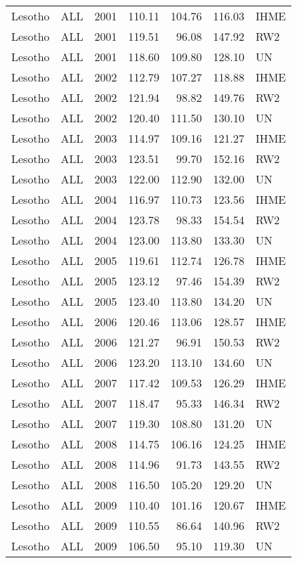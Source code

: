 \begin{longtable}{lllrrrl}
  Lesotho & ALL & 2001 & 110.11 & 104.76 & 116.03 & IHME \\ 
  Lesotho & ALL & 2001 & 119.51 & 96.08 & 147.92 & RW2 \\ 
  Lesotho & ALL & 2001 & 118.60 & 109.80 & 128.10 & UN \\ 
  Lesotho & ALL & 2002 & 112.79 & 107.27 & 118.88 & IHME \\ 
  Lesotho & ALL & 2002 & 121.94 & 98.82 & 149.76 & RW2 \\ 
  Lesotho & ALL & 2002 & 120.40 & 111.50 & 130.10 & UN \\ 
  Lesotho & ALL & 2003 & 114.97 & 109.16 & 121.27 & IHME \\ 
  Lesotho & ALL & 2003 & 123.51 & 99.70 & 152.16 & RW2 \\ 
  Lesotho & ALL & 2003 & 122.00 & 112.90 & 132.00 & UN \\ 
  Lesotho & ALL & 2004 & 116.97 & 110.73 & 123.56 & IHME \\ 
  Lesotho & ALL & 2004 & 123.78 & 98.33 & 154.54 & RW2 \\ 
  Lesotho & ALL & 2004 & 123.00 & 113.80 & 133.30 & UN \\ 
  Lesotho & ALL & 2005 & 119.61 & 112.74 & 126.78 & IHME \\ 
  Lesotho & ALL & 2005 & 123.12 & 97.46 & 154.39 & RW2 \\ 
  Lesotho & ALL & 2005 & 123.40 & 113.80 & 134.20 & UN \\ 
  Lesotho & ALL & 2006 & 120.46 & 113.06 & 128.57 & IHME \\ 
  Lesotho & ALL & 2006 & 121.27 & 96.91 & 150.53 & RW2 \\ 
  Lesotho & ALL & 2006 & 123.20 & 113.10 & 134.60 & UN \\ 
  Lesotho & ALL & 2007 & 117.42 & 109.53 & 126.29 & IHME \\ 
  Lesotho & ALL & 2007 & 118.47 & 95.33 & 146.34 & RW2 \\ 
  Lesotho & ALL & 2007 & 119.30 & 108.80 & 131.20 & UN \\ 
  Lesotho & ALL & 2008 & 114.75 & 106.16 & 124.25 & IHME \\ 
  Lesotho & ALL & 2008 & 114.96 & 91.73 & 143.55 & RW2 \\ 
  Lesotho & ALL & 2008 & 116.50 & 105.20 & 129.20 & UN \\ 
  Lesotho & ALL & 2009 & 110.40 & 101.16 & 120.67 & IHME \\ 
  Lesotho & ALL & 2009 & 110.55 & 86.64 & 140.96 & RW2 \\ 
  Lesotho & ALL & 2009 & 106.50 & 95.10 & 119.30 & UN \\ 

\end{longtable}
